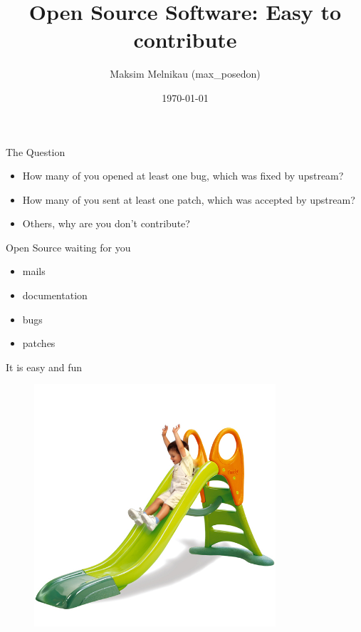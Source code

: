 \documentclass{beamer}
\begin{document}
\title{Open Source Software: Easy to contribute}
\author{Maksim Melnikau (max\_posedon)}
\date{\today}
\frame{\titlepage}

\begin{frame}[fragile]{The Question}
    \begin{itemize}
        \pause \item How many of you opened at least one bug, which was fixed by upstream?
        \pause \item How many of you sent at least one patch, which was accepted by upstream?
        \pause \item Others, why are you don't contribute?
    \end{itemize}
\end{frame}

\begin{frame}[fragile]{Open Source waiting for you}
    \begin{itemize}
        \pause
        \item mails
        \item documentation
        \item bugs
        \item patches
    \end{itemize}
\end{frame}

\begin{frame}[fragile]{It is easy and fun}
    \begin{figure}[htb]
    \includegraphics[width=0.8\textwidth]{easy.jpg}
    \end{figure}
\end{frame}
\end{document}

